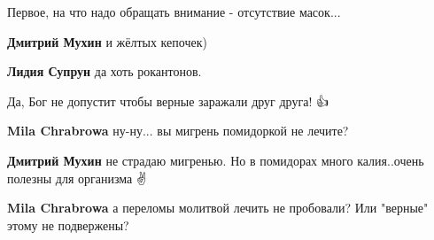 \begin{itemize}
Первое, на что надо обращать внимание - отсутствие масок...

\begin{itemize}
 
\textbf{Дмитрий Мухин} и жёлтых кепочек)

 
\textbf{Лидия Супрун} да хоть рокантонов.

 
Да, Бог не допустит чтобы верные заражали друг друга! 👍

 
\textbf{Mila Chrabrowa} ну-ну... вы мигрень помидоркой не лечите?

 
\textbf{Дмитрий Мухин} не страдаю мигренью. Но в помидорах много калия..очень полезны для организма ✌️

 
\textbf{Mila Chrabrowa} а переломы молитвой лечить не пробовали?
Или "верные" этому не подвержены?


\end{itemize}
\end{itemize}
